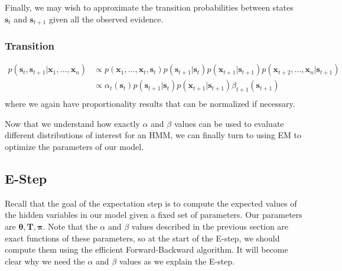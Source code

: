 Finally, we may wish to approximate the transition probabilities between states $\textbf{s}_t$ and $\textbf{s}_{t+1}$ given all the observed evidence.

\subsubsection{Transition}
\begin{align} \label{transition-fn}
	p(\textbf{s}_{t}, \textbf{s}_{t+1} | \textbf{x}_1, ..., \textbf{x}_n) &\propto p(\textbf{x}_1, ..., \textbf{x}_t, \textbf{s}_t) p(\textbf{s}_{t+1} | \textbf{s}_{t}) p(\textbf{x}_{t+1} | \textbf{s}_{t+1}) p(\textbf{x}_{t+2}, ..., \textbf{x}_{n} | \textbf{s}_{t+1}) \\
	&\propto \alpha_t(\textbf{s}_t) p(\textbf{s}_{t+1} | \textbf{s}_{t}) p(\textbf{x}_{t+1} | \textbf{s}_{t+1}) \beta_{t+1}(\textbf{s}_{t+1}) \\
\end{align}
where we again have proportionality results that can be normalized if necessary.

Now that we understand how exactly $\alpha$ and $\beta$ values can be used to evaluate different distributions of interest for an HMM, we can finally turn to using EM to optimize the parameters of our model.

\subsection{E-Step}
Recall that the goal of the expectation step is to compute the expected values of the hidden variables in our model given a fixed set of parameters. Our parameters are $\boldsymbol{\theta}, \textbf{T}, \boldsymbol{\pi}$. Note that the $\alpha$ and $\beta$ values described in the previous section are exact functions of these parameters, so at the start of the E-step, we should compute them using the efficient Forward-Backward algorithm. It will become clear why we need the $\alpha$ and $\beta$ values as we explain the E-step.

